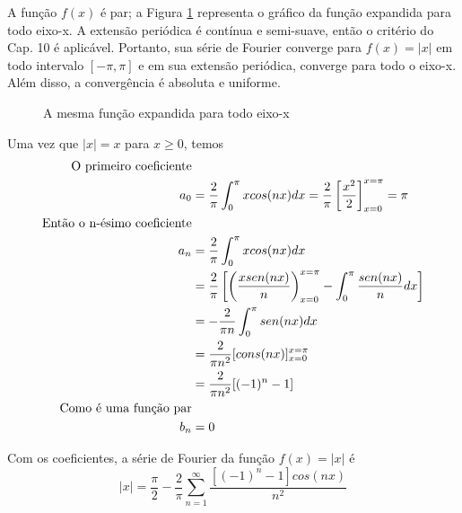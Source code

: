 A função $f(x)$ é par; a Figura \ref{fig:exemplo2} representa o gráfico da função 
expandida para todo eixo-x. A extensão periódica é contínua e semi-suave, então o critério
do Cap. 10 é aplicável. Portanto, sua série de Fourier converge para $f(x) = |x|$ em 
todo intervalo $[-\pi,\pi]$ e em sua extensão periódica, converge para todo o eixo-x.
Além disso, a convergência é absoluta e uniforme.

\begin{figure}[H]

    \caption{A mesma função expandida para todo eixo-x}
    \label{fig:exemplo2}
\end{figure}

Uma vez que $|x| = x$ para $x \geq 0$, temos
\begin{equation}
\notag
\label{eq:exemplo2SF}
    \begin{split}
        \text{O primeiro coeficiente}&\\
        a_0 &= \dfrac{2}{\pi}\int_0^{\pi}x cos(nx)dx = \dfrac{2}{\pi} \left[\dfrac{x^2}{2}\right]_{x=0}^{x=\pi} = \pi\\
        \text{Então o n-ésimo coeficiente}&\\
        a_n &= \dfrac{2}{\pi}\int_{0}^{\pi}x cos(nx)dx\\
        &= \dfrac{2}{\pi}\left[\left(\dfrac{x sen(nx)}{n}\right)_{x=0}^{x=\pi} - \int_{0}^{\pi}\dfrac{sen(nx)}{n}dx\right]\\
        &= -\dfrac{2}{\pi n}\int_{0}^{\pi}sen(nx)dx\\
        &= \dfrac{2}{\pi n^2}[cons(nx)]_{x=0}^{x=\pi}\\
        &= \dfrac{2}{\pi n^2}[(-1)^n - 1]\\
        \text{Como é uma função par}&\\
        b_n &= 0
    \end{split}
\end{equation}

Com os coeficientes, a série de Fourier da função $f(x) = |x|$ é
\begin{equation}
    |x| = \dfrac{\pi}{2} - \dfrac{2}{\pi}\sum\limits_{n=1}^{\infty} \dfrac{[(-1)^n - 1]cos(nx)}{n^2}
\end{equation}